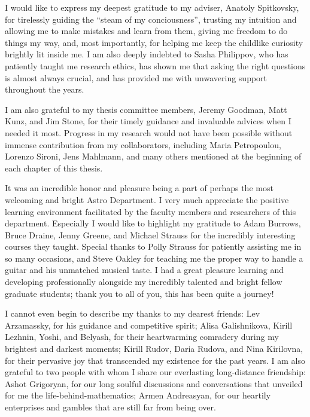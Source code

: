 
 I would like to express my deepest gratitude to my adviser, Anatoly Spitkovsky, for tirelessly guiding the ``steam of my conciousness'', trusting my intuition and allowing me to make mistakes and learn from them, giving me freedom to do things my way, and, most importantly, for helping me keep the childlike curiosity brightly lit inside me. I am also deeply indebted to Sasha Philippov, who has patiently taught me research ethics, has shown me that asking the right questions is almost always crucial, and has provided me with unwavering support throughout the years. 

I am also grateful to my thesis committee members, Jeremy Goodman, Matt Kunz, and Jim Stone, for their timely guidance and invaluable advices when I needed it most. Progress in my research would not have been possible without immense contribution from my collaborators, including Maria Petropoulou, Lorenzo Sironi, Jens Mahlmann, and many others mentioned at the beginning of each chapter of this thesis. 

It was an incredible honor and pleasure being a part of perhaps the most welcoming and bright Astro Department. I very much appreciate the positive learning environment facilitated by the faculty members and researchers of this department. Especially I would like to highlight my gratitude to Adam Burrows, Bruce Draine, Jenny Greene, and Michael Strauss for the incredibly interesting courses they taught. Special thanks to Polly Strauss for patiently assisting me in so many occasions, and Steve Oakley for teaching me the proper way to handle a guitar and his unmatched musical taste. I had a great pleasure learning and developing professionally alongside my incredibly talented and bright fellow graduate students; thank you to all of you, this has been quite a journey!

I cannot even begin to describe my thanks to my dearest friends: Lev Arzamassky, for his guidance and competitive spirit; Alisa Galishnikova, Kirill Lezhnin, Yoshi, and Belyash, for their heartwarming comradery during my brightest and darkest moments; Kirill Rudov, Daria Rudova, and Nina Kirilovna, for their pervasive joy that transcended my existence for the past years. I am also grateful to two people with whom I share our everlasting long-distance friendship: Ashot Grigoryan, for our long soulful discussions and conversations that unveiled for me the life-behind-mathematics; Armen Andreasyan, for our heartily enterprises and gambles that are still far from being over. 


